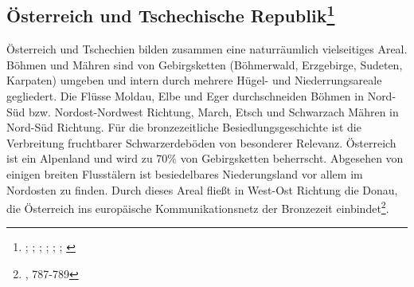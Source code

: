 \documentclass[openany,twoside,twocolumn]{book}
\let\rmarkdownfootnote\footnote%
\def\footnote{\protect\rmarkdownfootnote}
\begin{document}
\hypertarget{osterreich-und-tschechische-republik}{%
\subsection[Österreich und Tschechische Republik]{\texorpdfstring{Österreich und Tschechische Republik\footnote{\textcite{hampl_mittelbronzezeitliche_1982}; \textcite{hicke_hugel-_1987}; \textcite{lauermann_studien_2003}; \textcite{lippert_brandbestattungen_2013}; \textcite{lubos_czech_2013}; \textcite{neugebauer_bronzezeit_1994}; \textcite{vera_saldova_burial_1990}}}{Österreich und Tschechische Republik}}\label{osterreich-und-tschechische-republik}}

Österreich und Tschechien bilden zusammen eine naturräumlich vielseitiges Areal. Böhmen und Mähren sind von Gebirgsketten (Böhmerwald, Erzgebirge, Sudeten, Karpaten) umgeben und intern durch mehrere Hügel- und Niederrungsareale gegliedert. Die Flüsse Moldau, Elbe und Eger durchschneiden Böhmen in Nord-Süd bzw. Nordost-Nordwest Richtung, March, Etsch und Schwarzach Mähren in Nord-Süd Richtung. Für die bronzezeitliche Besiedlungsgeschichte ist die Verbreitung fruchtbarer Schwarzerdeböden von besonderer Relevanz. Österreich ist ein Alpenland und wird zu 70\% von Gebirgsketten beherrscht. Abgesehen von einigen breiten Flusstälern ist besiedelbares Niederungsland vor allem im Nordosten zu finden. Durch dieses Areal fließt in West-Ost Richtung die Donau, die Österreich ins europäische Kommunikationsnetz der Bronzezeit einbindet\footnote{\textcite{lubos_czech_2013}, 787-789}.
\end{document}
